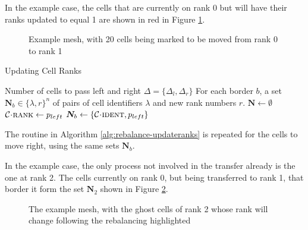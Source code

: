 \documentclass{IIBproject}
\newcommand{\vect} [1] {\bm{#1}}
\newcommand{\acc}{{\mkern 0.5mu\cdot\mkern 0.5mu}}
\numberwithin{figure}{section}
\begin{document}
            In the example case, the cells that are currently on rank 0 but will have their ranks updated to equal 1 are shown in red in Figure \ref{fig:rebalance-ranks}.

            \begin{figure}[H]
                
                \caption{Example mesh, with 20 cells being marked to be moved from rank 0 to rank 1}
                \label{fig:rebalance-ranks}
            \end{figure}

            \begin{algorithm}[H]
                \caption{Updating Cell Ranks}
                \label{alg:rebalance-updateranks}

                \begin{algorithmic}
                    \Require Number of cells to pass left and right $\Delta = \{\Delta_l,\Delta_r\}$
                    \Ensure For each border $b$, a set $\vect{N}_b \in \{\lambda,r\}^n$ of pairs of cell identifiers $\lambda$ and new rank numbers $r$.
                    \Statex
                    \State $\vect{N} \gets \emptyset$
                        \State $\mathcal{C} \acc \textproc{rank} \gets p_{left}$
                                \State $\vect{N}_b \gets \{\mathcal{C} \acc \textproc{ident} , p_{left}\}$
                            \EndIf
                        \EndFor
                    \EndFor
                \end{algorithmic}
            \end{algorithm}

            The routine in Algorithm \ref{alg:rebalance-updateranks} is repeated for the cells to move right, using the same sets $\vect{N}_b$.

            In the example case, the only process not involved in the transfer already is the one at rank 2. The cells currently on rank 0, but being transferred to rank 1, that border it form the set $\vect{N}_2$ shown in Figure \ref{fig:rebalance-notify}.

            \begin{figure}[H]
                
                \caption{The example mesh, with the ghost cells of rank 2 whose rank will change following the rebalancing highlighted}
                \label{fig:rebalance-notify}
            \end{figure}
\end{document}
